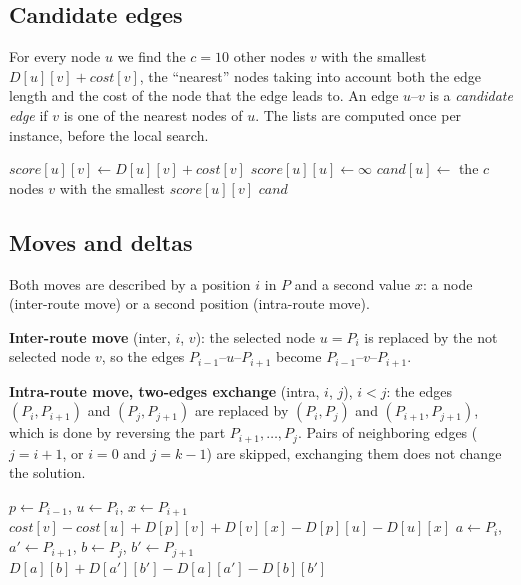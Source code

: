 \documentclass[11pt,a4paper]{article}
\begin{document}
\subsection*{Candidate edges}
For every node $u$ we find the $c = 10$ other nodes $v$ with the smallest $D[u][v] + \mathit{cost}[v]$,
the ``nearest'' nodes taking into account both the edge length and the cost of the node that the
edge leads to. An edge $u$--$v$ is a \emph{candidate edge} if $v$ is one of the nearest nodes of $u$.
The lists are computed once per instance, before the local search.

\begin{algorithm}[H]
\caption{Candidate lists}
\begin{algorithmic}[1]
      \State $\mathit{score}[u][v] \gets D[u][v] + \mathit{cost}[v]$
    \EndFor
    \State $\mathit{score}[u][u] \gets \infty$ 
    \State $\mathit{cand}[u] \gets$ the $c$ nodes $v$ with the smallest $\mathit{score}[u][v]$
  \EndFor
  \State \Return $\mathit{cand}$
\EndFunction
\end{algorithmic}
\end{algorithm}

\subsection*{Moves and deltas}
Both moves are described by a position $i$ in $P$ and a second value $x$: a node (inter-route move) or
a second position (intra-route move).

\textbf{Inter-route move} (inter, $i$, $v$): the selected node $u = P_i$ is replaced by the not
selected node $v$, so the edges $P_{i-1}$--$u$--$P_{i+1}$ become $P_{i-1}$--$v$--$P_{i+1}$.

\textbf{Intra-route move, two-edges exchange} (intra, $i$, $j$), $i < j$: the edges $(P_i, P_{i+1})$
and $(P_j, P_{j+1})$ are replaced by $(P_i, P_j)$ and $(P_{i+1}, P_{j+1})$, which is done by reversing
the part $P_{i+1}, \dots, P_j$. Pairs of neighboring edges ($j = i + 1$, or $i = 0$ and $j = k - 1$)
are skipped, exchanging them does not change the solution.

\begin{algorithm}[H]
\caption{Deltas of the two moves}
\begin{algorithmic}[1]
  \State $p \gets P_{i-1}$, $u \gets P_i$, $x \gets P_{i+1}$
  \State \Return $\mathit{cost}[v] - \mathit{cost}[u] + D[p][v] + D[v][x] - D[p][u] - D[u][x]$
\EndFunction
\Statex
{}
  \State $a \gets P_i$, $a' \gets P_{i+1}$, $b \gets P_j$, $b' \gets P_{j+1}$
  \State \Return $D[a][b] + D[a'][b'] - D[a][a'] - D[b][b']$
\EndFunction
\end{algorithmic}
\end{algorithm}
\end{document}
